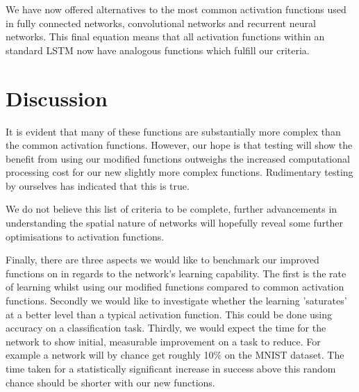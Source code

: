 \documentclass[onecolumn]{article}
\begin{document}
    We have now offered alternatives to the most common activation functions used in fully connected networks, convolutional networks and recurrent neural networks. This final equation means that all activation functions within an standard LSTM now have analogous functions which fulfill our criteria.
    \section{Discussion}
    It is evident that many of these functions are substantially more complex than the common activation functions. However, our hope is that testing will show the benefit from using our modified functions outweighs the increased computational processing cost for our new slightly more complex functions. Rudimentary testing by ourselves has indicated that this is true.

    We do not believe this list of criteria to be complete, further advancements in understanding the spatial nature of networks will hopefully reveal some further optimisations to activation functions.

    Finally, there are three aspects we would like to benchmark our improved functions on in regards to the network's learning capability. The first is the rate of learning whilst using our modified functions compared to common activation functions. Secondly we would like to investigate whether the learning 'saturates' at a better level than a typical activation function. This could be done using accuracy on a classification task. Thirdly, we would expect the time for the network to show initial, measurable improvement on a task to reduce. For example a network will by chance get roughly 10\% on the MNIST dataset. The time taken for a statistically significant increase in success above this random chance should be shorter with our new functions.

\end{document}
